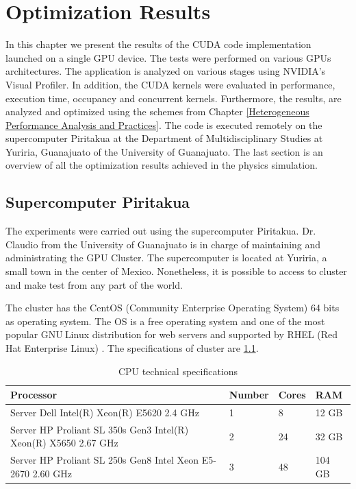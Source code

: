 
\chapter{Optimization Results} %

\label{Optimization Results} %



In this chapter we present the results of the CUDA code implementation launched on a single GPU device. The tests were performed on various GPUs architectures. The application is analyzed on various stages using NVIDIA's Visual Profiler. In addition, the CUDA kernels were evaluated in performance, execution time, occupancy and concurrent kernels. Furthermore, the results, are analyzed and optimized using the schemes from Chapter \ref{Heterogeneous Performance Analysis and Practices}. The code is executed remotely on the supercomputer Piritakua at the Department of Multidisciplinary Studies at Yuriria, Guanajuato of the University of Guanajuato. The last section is an overview of all the optimization results achieved in the physics simulation.

\section{Supercomputer Piritakua}

The experiments were carried out using the supercomputer Piritakua. Dr. Claudio from the University of Guanajuato is in charge of maintaining and administrating the GPU Cluster. The supercomputer is located at Yuriria, a small town in the center of Mexico. Nonetheless, it is possible to access to cluster and make test from any part of the world.

The cluster has the CentOS (Community Enterprise Operating System) 64 bits as operating system. The OS is a free operating system and one of the most popular GNU$ \ $Linux distribution for web servers and supported by RHEL (Red Hat Enterprise Linux) \cite{centos}. The specifications of cluster are \ref{tab:cpus}.

\begin{table}[h]
\centering
\begin{tabular}{ | p{7.1cm}  | l | l | l |}
  \hline
  Processor & Number & Cores & RAM  \\
  \hline
  Server Dell Intel(R) Xeon(R) E5620 2.4 GHz & 1 & 8 & 12 GB \\
  \hline
  Server HP Proliant SL 350s Gen3 Intel(R) Xeon(R) X5650 2.67 GHz & 2 & 24 & 32 GB \\
  \hline
   Server HP Proliant SL 250s Gen8 Intel Xeon E5-2670 2.60 GHz & 3 & 48 & 104 GB \\
   \hline
  \end{tabular}
      \caption{CPU technical specifications}
  \label{tab:cpus}
  \end{table}

